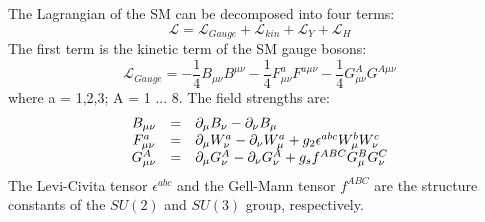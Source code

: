 \documentclass[thesis.tex]{subfiles}
\begin{document}
The Lagrangian of the SM can be decomposed into four terms: 
	\begin{equation}
		\mathcal{L} =  \mathcal{L}_{Gauge} + \mathcal{L}_{kin} + \mathcal{L}_{Y} + \mathcal{L}_{H}
		\label{eq:SMLagrangian}
	\end{equation}
The first term is the kinetic term of the SM gauge bosons:
	\begin{equation} 
		\mathcal{L}_{Gauge} = -\frac{1}{4}B_{\mu\nu} B^{\mu\nu} - \frac{1}{4}F_{\mu\nu}^a F^{a \mu\nu} - \frac{1}{4} G_{\mu\nu}^A G^{A \mu\nu}
	\end{equation}
where a = 1,2,3; A = 1 ... 8. The field strengths are:
	\begin{equation}
		\begin{array}{c c l}
			B_{\mu\nu} & = & \partial_\mu B_\nu - \partial_\nu B_\mu \\
			F_{\mu\nu}^a &=&  \partial_\mu W_\nu^a - \partial_\nu W_\mu^a + g_2 \epsilon^{abc}W_\mu^b W_\nu^c \\
			G_{\mu\nu}^A &=& \partial_\mu G_\nu^A - \partial_\nu G_\nu^A + g_s f^{ABC}G_{\mu}^B G_{\nu}^C 
		\end{array}
	\end{equation}
The Levi-Civita tensor $\epsilon^{abc}$ and the Gell-Mann tensor $f^{ABC}$ are the structure constants of the $SU(2)$ and $SU(3)$ group, respectively. 
		
\end{document}
